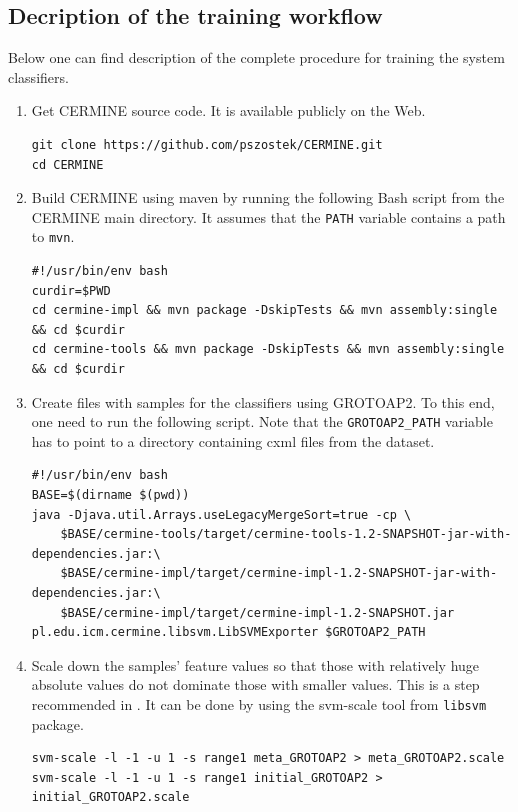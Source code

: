 \blankpage
\begin{appendix}
\noappendicestocpagenum
\addappheadtotoc
\chapter{Decription of the training workflow}
\label{appendix:training_workflow}
Below one can find description of the complete procedure for training the system classifiers.
\begin{enumerate}
\item Get CERMINE source code. It is available publicly on the Web.
\lstset{language=bash}
\begin{lstlisting}
git clone https://github.com/pszostek/CERMINE.git
cd CERMINE
\end{lstlisting}
\item Build CERMINE using maven by running the following Bash script from the CERMINE main directory. It assumes that the \verb+PATH+ variable contains a path to \verb+mvn+.
\begin{lstlisting}
#!/usr/bin/env bash
curdir=$PWD
cd cermine-impl && mvn package -DskipTests && mvn assembly:single && cd $curdir
cd cermine-tools && mvn package -DskipTests && mvn assembly:single && cd $curdir
\end{lstlisting}
\item Create files with samples for the classifiers using GROTOAP2. To this end, one need to run the following script. Note that the \verb+GROTOAP2_PATH+ variable has to point to a directory containing cxml files from the dataset.
\begin{lstlisting}
#!/usr/bin/env bash
BASE=$(dirname $(pwd))
java -Djava.util.Arrays.useLegacyMergeSort=true -cp \
    $BASE/cermine-tools/target/cermine-tools-1.2-SNAPSHOT-jar-with-dependencies.jar:\
    $BASE/cermine-impl/target/cermine-impl-1.2-SNAPSHOT-jar-with-dependencies.jar:\
    $BASE/cermine-impl/target/cermine-impl-1.2-SNAPSHOT.jar pl.edu.icm.cermine.libsvm.LibSVMExporter $GROTOAP2_PATH
\end{lstlisting}
\item Scale down the samples' feature values so that those with relatively huge absolute values do not dominate those with smaller values. This is a step recommended in \cite{Chih-WeiHsu2010}. It can be done by using the svm-scale tool from \verb+libsvm+ package.
\begin{lstlisting}
svm-scale -l -1 -u 1 -s range1 meta_GROTOAP2 > meta_GROTOAP2.scale
svm-scale -l -1 -u 1 -s range1 initial_GROTOAP2 > initial_GROTOAP2.scale

\end{lstlisting}
\end{enumerate}
\end{appendix}
